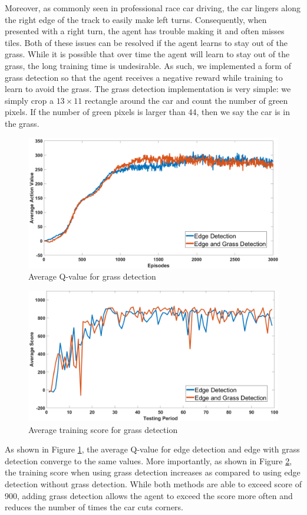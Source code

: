 Moreover, as commonly seen in professional race car driving, the 
car lingers along the right edge of the track to easily make left turns.
Consequently, when presented with a right turn, the agent has trouble
making it and often misses tiles. Both of these issues can be resolved
if the agent learns to stay out of the grass. While it is possible that
over time the agent will learn to stay out of the grass, the long training
time is undesirable. As such, we implemented a form of grass detection
so that the agent receives a negative reward while training to learn
to avoid the grass. The grass detection implementation is very simple: we 
simply crop a $13 \times 11$ rectangle around the car and count the
number of green pixels. If the number of green pixels is larger than 44, 
then we say the car is in the grass. 

\begin{figure}[]
\centering
\includegraphics[width=.6\linewidth]{Graphics/grass_perf_q_large.png}
\caption{Average Q-value for grass detection}
\label{fig:grass_perf_q}
\end{figure}

\begin{figure}[h!]
\centering
\includegraphics[width=.6\linewidth]{Graphics/grass_perf_score_large.png}
\caption{Average training score for grass detection}
\label{fig:grass_perf_score}
\end{figure}

As shown in Figure \ref{fig:grass_perf_q}, the average Q-value for
edge detection and edge with grass detection converge to the same values.
More importantly, as shown in Figure \ref{fig:grass_perf_score}, the training score
when using grass detection increases as compared to using edge detection
without grass detection. While both methods are able to exceed score of 
900, adding grass detection allows the agent to exceed the score more often
and reduces the number of times the car cuts corners. 

